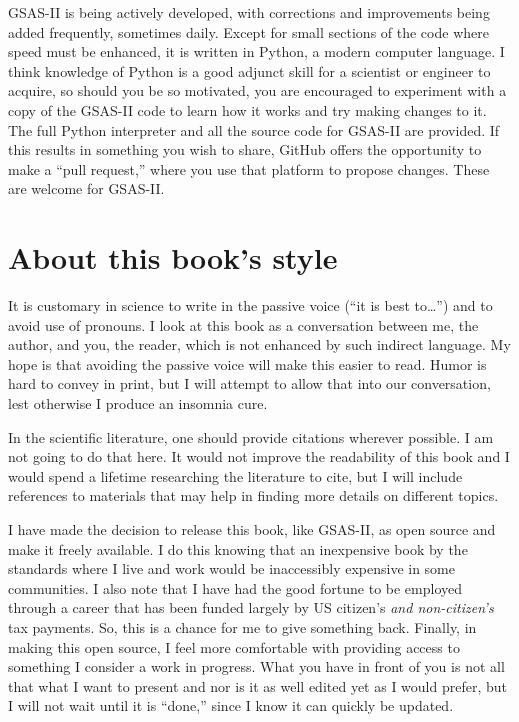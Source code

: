 GSAS-II is being actively developed, with corrections and improvements being added frequently, sometimes daily. Except for small sections of the code where speed must be enhanced, it is written in Python, a modern computer language. I think knowledge of Python is a good adjunct skill for a scientist or engineer to acquire, so should you be so motivated, you are encouraged to experiment with a copy of the GSAS-II code to learn how it works and try making changes to it. The full Python interpreter and all the source code for GSAS-II are provided. 
If this results in something you wish to share, GitHub offers the opportunity to make a ``pull request,'' where you use that platform to propose changes. These are welcome for GSAS-II. 

\section*{About this book's style}

 It is customary in science to write in the passive voice (“it is best to…”) and to avoid use of pronouns. I look at this book as a conversation between me, the author, and you, the reader, which is not enhanced by such indirect language. My hope is that avoiding the passive voice will make this easier to read. Humor is hard to convey in print, but I will attempt to allow that into our conversation, lest otherwise I produce an insomnia cure. 
 
 In the scientific literature, one should provide citations wherever possible. I am not going to do that here. It would not improve the readability of this book and I would spend a lifetime researching the literature to cite, but I will include references to materials that may help in finding more details on different topics.

 I have made the decision to release this book, like GSAS-II, as open source and make it freely available. I do this knowing that an inexpensive book by the standards where I live and work would be inaccessibly expensive in some communities. I also note that I have had the good fortune to be employed through a career that has been funded largely by US citizen's \textit{and non-citizen's} tax payments. So, this is a chance for me to give something back. Finally, in making this open source, I feel more comfortable with providing access to something I consider a work in progress. What you have in front of you is not all that what I want to present and nor is it as well edited yet as I would prefer, but I will not wait until it is ``done,'' since I know it can quickly be updated. 

